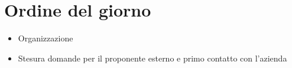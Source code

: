 \section{Ordine del giorno}
\begin{itemize}
\item Organizzazione \Glossario
\item Stesura domande per il proponente esterno e primo contatto con l'azienda
\end{itemize}